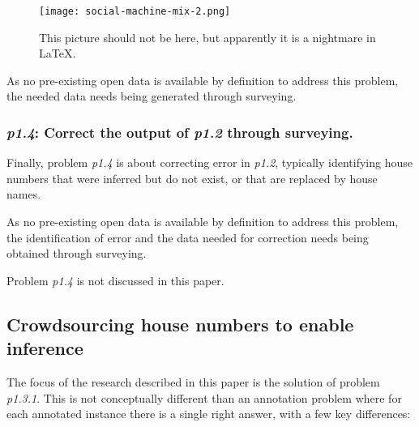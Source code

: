         \begin{figure*}
        	\texttt{[image: social-machine-mix-2.png]}
        	\caption{This picture should not be here, but apparently it is a nightmare in LaTeX.}
        	\label{fig:social_machine_mix_2}
        \end{figure*}
        
        As no pre-existing open data is available by definition to address this problem, the needed data needs being generated through surveying. 

    \subsubsection{{\it p1.4}: Correct the output of {\it p1.2} through surveying.} 

        Finally, problem {\it p1.4} is about correcting error in {\it p1.2}, typically identifying house numbers that were inferred but do not exist, or that are replaced by house names.
        
        As no pre-existing open data is available by definition to address this problem, the identification of error and the data needed for correction needs being obtained through surveying. 

        Problem {\it p1.4} is not discussed in this paper.

\subsection{Crowdsourcing house numbers to enable inference}

    The focus of the research described in this paper is the solution of problem {\it p1.3.1}. This is not conceptually different than an annotation problem where for each annotated instance there is a single right answer, with a few key differences:
    
